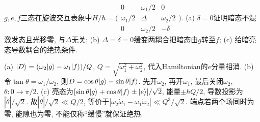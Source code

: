 \begin{exercise}$g,e,f$三态在旋波交互表象中$H/\hbar=\bigl(\begin{smallmatrix}0&\omega_1/2&0\\\omega_1/2&\Delta&\omega_2/2\\0&\omega_2/2&-\delta\end{smallmatrix}\bigr)$. (a) $\delta=0$证明暗态不混激发态且光移零, 与$\Delta$无关; (b) $\Delta=\delta=0$缓变两耦合把暗态由$g$转至$f$; (c) 给暗亮态导数耦合的绝热条件.\end{exercise}
\begin{solution}(a) $\lvert D\rangle=(\omega_2\lvert g\rangle-\omega_1\lvert f\rangle)/Q$, $Q=\sqrt{\omega_1^2+\omega_2^2}$, 代入Hamiltonian的$e$分量相消. (b) 令$\tan\theta=\omega_1/\omega_2$, 则$D=\cos\theta\lvert g\rangle-\sin\theta\lvert f\rangle$. 先开$\omega_2$, 再开$\omega_1$, 最后关闭$\omega_2$, $\theta:0\to\pi/2$. (c) 亮态为$[\sin\theta\lvert g\rangle+\cos\theta\lvert f\rangle\pm\lvert e\rangle]/\sqrt2$, 能量$\pm\hbar Q/2$, 导数投影为$|\dot\theta|/\sqrt2$. 故$|\dot\theta|/\sqrt2\ll Q/2$, 等价于$|\omega_2\dot\omega_1-\omega_1\dot\omega_2|\ll Q^3/\sqrt2$. 端点若两个场同时为零, 能隙也为零, 不能仅称“缓慢”就保证绝热.
\end{solution}
